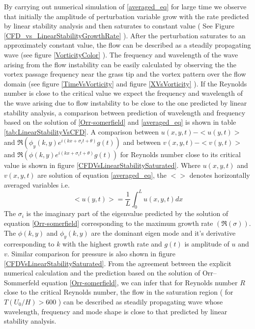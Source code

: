 \documentclass[12pt]{report}   %
\begin{document}
By carrying out numerical simulation of \eqref{averaged_eq} for large time we observe that initially the amplitude of perturbation variable grow with the rate predicted by linear stability analysis and then saturates to constant value (  See Figure \ref{CFD_vs_LinearStabilityGrowthRate} ). After the perturbation saturates to an approximately constant value, the flow can be described as a steadily propagating wave (see figure \ref{VorticityColor} ). The frequency and wavelength of the wave arising from the flow instability can be easily calculated by observing the the vortex passage frequency near the grass tip and the vortex pattern over the flow domain (see figure \ref{TimeVsVorticity} and figure \ref{XVsVorticity} ). If the Reynolds number is close to the critical value we expect the frequency and wavelength of the wave arising due to flow instability to be close to the one predicted by linear stability analysis, a comparison between prediction of wavelength and frequency based on the solution of \eqref{Orr-somerfield} and \eqref{averaged_eq} is shown in table \ref{tab:LinearStabilityVsCFD}. A comparison between $u(x,y,t)-<u(y,t)>$ and 
 $\Re\left(\phi_y(k,y) e^{i\left(kx+\sigma_i t+ \theta\right)} g(t) \right)$  and between $v(x,y,t)-<v(y,t)>$ and $\Re\left(\phi(k,y) e^{i\left(kx+\sigma_i t+ \theta\right)} g(t) \right)$ for Reynolds number close to its critical value is shown in figure \ref{CFDVsLinearStabilitySaturated}. Where $u(x,y,t)$ and $v(x,y,t)$ are solution of equation \eqref{averaged_eq}, the $< >$ denotes horizontally averaged variables i.e.
 \[<u(y,t)> = \frac{1}{L}\int_{0}^{L} u(x,y,t) dx\]
 The $\sigma_i$ is the imaginary part of the eigenvalue predicted by the solution of equation \ref{Orr-somerfield} corresponding to the maximum growth rate $(\Re(\sigma))$. The $\phi(k,y)$ and $\phi_y(k,y)$ are the dominant eigen mode and it's derivative corresponding to $k$ with the highest growth rate and $g(t)$ is amplitude of $u$ and $v$. Similar comparison for pressure is also shown in figure \ref{CFDVsLinearStabilitySaturated}. From the agreement between the explicit numerical calculation and the prediction based on the solution of Orr–Sommerfeld equation \ref{Orr-somerfield}, we can infer that for Reynolds number $R$ close to the critical Reynolds number, the flow in the saturation region ( for $T(U_0/H)>600$ ) can be described as steadily propagating wave whose wavelength, frequency and mode shape is close to that predicted by linear stability analysis.  
\end{document}
